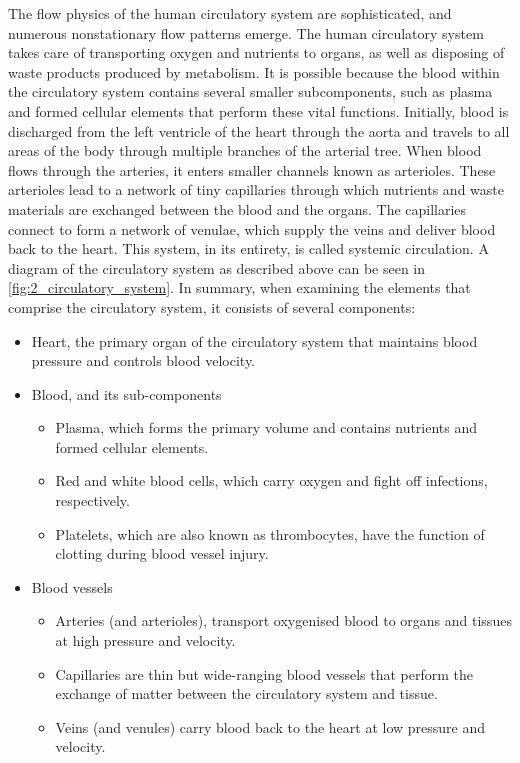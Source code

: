 The flow physics of the human circulatory system are sophisticated, and numerous nonstationary flow patterns emerge. The human circulatory system takes care of transporting oxygen and nutrients to organs, as well as disposing of waste products produced by metabolism. It is possible because the blood within the circulatory system contains several smaller subcomponents, such as plasma and formed cellular elements that perform these vital functions. Initially, blood is discharged from the left ventricle of the heart through the aorta and travels to all areas of the body through multiple branches of the arterial tree. When blood flows through the arteries, it enters smaller channels known as arterioles. These arterioles lead to a network of tiny capillaries through which nutrients and waste materials are exchanged between the blood and the organs. The capillaries connect to form a network of venulae, which supply the veins and deliver blood back to the heart. This system, in its entirety, is called systemic circulation. A diagram of the circulatory system as described above can be seen in \cref{fig:2_circulatory_system}. In summary, when examining the elements that comprise the circulatory system, it consists of several components:
\begin{itemize}
	\item Heart, the primary organ of the circulatory system that maintains blood pressure and controls blood velocity.
	\item Blood, and its sub-components
	\begin{itemize}
		\item Plasma, which forms the primary volume and contains nutrients and formed cellular elements.
		\item Red and white blood cells, which carry oxygen and fight off infections, respectively.
		\item Platelets, which are also known as thrombocytes, have the function of clotting during blood vessel injury.
	\end{itemize}
	\item Blood vessels
	\begin{itemize}
		\item Arteries (and arterioles), transport oxygenised blood to organs and tissues at high pressure and velocity.
		\item Capillaries are thin but wide-ranging blood vessels that perform the exchange of matter between the circulatory system and tissue.
		\item Veins (and venules) carry blood back to the heart at low pressure and velocity.
	\end{itemize}
\end{itemize}

